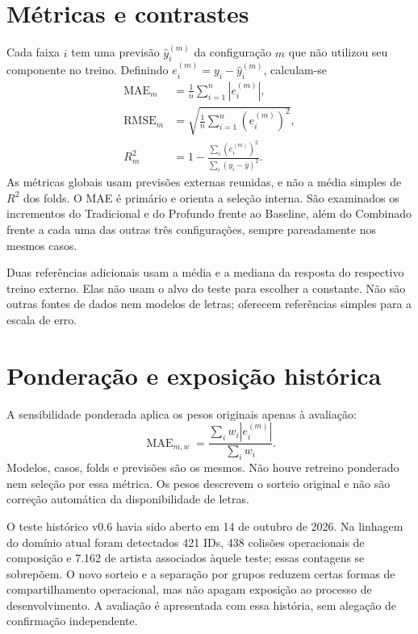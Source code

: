 \section{Métricas e contrastes}
Cada faixa $i$ tem uma previsão $\widehat y_i^{(m)}$ da configuração $m$ que não utilizou seu componente no treino. Definindo $e_i^{(m)}=y_i-\widehat y_i^{(m)}$, calculam-se
\begin{align}
 \operatorname{MAE}_m&=\frac{1}{n}\sum_{i=1}^{n}|e_i^{(m)}|,\label{eq:mae}\\
 \operatorname{RMSE}_m&=\sqrt{\frac{1}{n}\sum_{i=1}^{n}(e_i^{(m)})^2},\label{eq:rmse}\\
 R_m^2&=1-\frac{\sum_i(e_i^{(m)})^2}{\sum_i(y_i-\overline y)^2}.\label{eq:r2}
\end{align}
As métricas globais usam previsões externas reunidas, e não a média simples de $R^2$ dos folds. O MAE é primário e orienta a seleção interna. São examinados os incrementos do Tradicional e do Profundo frente ao Baseline, além do Combinado frente a cada uma das outras três configurações, sempre pareadamente nos mesmos casos.

Duas referências adicionais usam a média e a mediana da resposta do respectivo treino externo. Elas não usam o alvo do teste para escolher a constante. Não são outras fontes de dados nem modelos de letras; oferecem referências simples para a escala de erro.

\section{Ponderação e exposição histórica}
A sensibilidade ponderada aplica os pesos originais apenas à avaliação:
\begin{equation}\label{eq:maeponderado}
 \operatorname{MAE}_{m,w}=\frac{\sum_i w_i|e_i^{(m)}|}{\sum_i w_i}.
\end{equation}
Modelos, casos, folds e previsões são os mesmos. Não houve retreino ponderado nem seleção por essa métrica. Os pesos descrevem o sorteio original e não são correção automática da disponibilidade de letras.

O teste histórico v0.6 havia sido aberto em 14 de outubro de 2026. Na linhagem do domínio atual foram detectados 421 IDs, 438 colisões operacionais de composição e 7.162 de artista associados àquele teste; essas contagens se sobrepõem. O novo sorteio e a separação por grupos reduzem certas formas de compartilhamento operacional, mas não apagam exposição ao processo de desenvolvimento. A avaliação é apresentada com essa história, sem alegação de confirmação independente.
